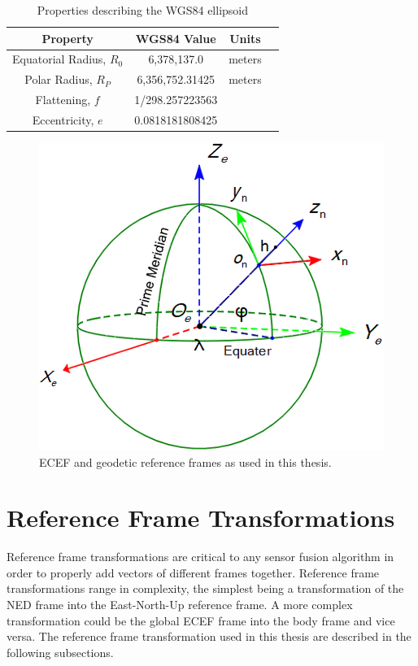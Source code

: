 \begin{table}[!ht]
    \caption{Properties describing the WGS84 ellipsoid}\label{tbl:wgs84}
    \centering
    \begin{tabular}{cccc}
        \toprule
        \textbf{Property}          & \textbf{WGS84 Value} & \textbf{Units} \\
        \midrule
        Equatorial Radius, \(R_0\) & 6,378,137.0          & meters         \\
        Polar Radius, \(R_P\)      & 6,356,752.31425      & meters         \\
        Flattening, \(f\)          & 1/298.257223563      &                \\
        Eccentricity, \(e\)        & 0.0818181808425      &                \\
        \bottomrule
    \end{tabular}
\end{table}

\begin{figure}[!ht]
    \centering
    \includegraphics[width=0.75\linewidth]{Figures/globalframe.png}
    \caption{ECEF and geodetic reference frames as used in this thesis.}\label{fig:globalframes}
\end{figure}

\clearpage
\section{Reference Frame Transformations}
Reference frame transformations are critical to any sensor fusion algorithm in order to properly add vectors of different frames together. Reference frame transformations range in complexity, the simplest being a transformation of the NED frame into the East-North-Up reference frame. A more complex transformation could be the global ECEF frame into the body frame and vice versa. The reference frame transformation used in this thesis are described in the following subsections.

